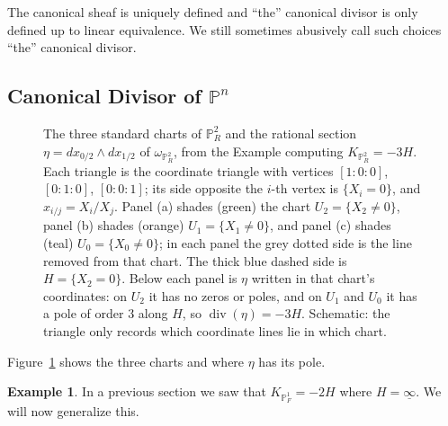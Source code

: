 \documentclass[12pt]{article}
\numberwithin{equation}{section}
\theoremstyle{definition}
\newtheorem{example}[theorem]{Example}
\theoremstyle{remark}
\newcommand{\PP}{\mathbb{P}}
\renewcommand{\div}{\operatorname{div}}
\begin{document}
The canonical sheaf is uniquely defined and ``the'' canonical divisor is only defined up to linear equivalence. 
We still sometimes abusively call such choices ``the'' canonical divisor.

\subsection{Canonical Divisor of $\PP^n$}
\begin{figure}[H]
\centering

\caption{The three standard charts of $\PP^2_R$ and the rational section $\eta=dx_{0/2}\wedge dx_{1/2}$ of $\omega_{\PP^2_R}$, from the Example computing $K_{\PP^2_R}=-3H$. Each triangle is the coordinate triangle with vertices $[1{:}0{:}0]$, $[0{:}1{:}0]$, $[0{:}0{:}1]$; its side opposite the $i$-th vertex is $\{X_i=0\}$, and $x_{i/j}=X_i/X_j$. Panel (a) shades (green) the chart $U_2=\{X_2\neq0\}$, panel (b) shades (orange) $U_1=\{X_1\neq0\}$, and panel (c) shades (teal) $U_0=\{X_0\neq0\}$; in each panel the grey dotted side is the line removed from that chart. The thick blue dashed side is $H=\{X_2=0\}$. Below each panel is $\eta$ written in that chart's coordinates: on $U_2$ it has no zeros or poles, and on $U_1$ and $U_0$ it has a pole of order $3$ along $H$, so $\div(\eta)=-3H$. Schematic: the triangle only records which coordinate lines lie in which chart.}\label{fig:canonical-p2}
\end{figure}
Figure~\ref{fig:canonical-p2} shows the three charts and where $\eta$ has its pole.

\begin{example}
In a previous section we saw that $K_{\PP^1_F} = -2H$ where $H = \underline{\infty}$.
We will now generalize this.
\end{example}
\end{document}
